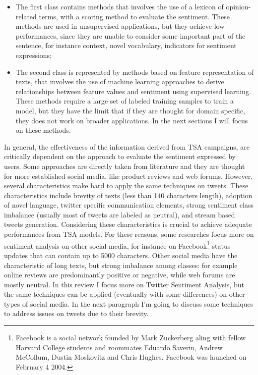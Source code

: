 \begin{itemize}
	\item The first class contains methods that involves the use of a lexicon of opinion-related terms, with a scoring method to evaluate the sentiment. These methods are used in unsupervised applications, but they achieve low performances, since they are unable to consider some important part of the sentence, for instance context, novel vocabulary, indicators for sentiment expressions;
	\item The second class is represented by methods based on feature representation of texts, that involves the use of machine learning approaches to derive relationships between feature values and sentiment using supervised learning. These methods require a large set of labeled training samples to train a model, but they have the limit that if they are thought for domain specific, they does not work on broader applications. In the next sections I will focus on these methods.
\end{itemize}
In general, the effectiveness of the information derived from TSA campaigns, are critically dependent on the approach to evaluate the sentiment expressed by users. Some approaches are directly taken from literature and they are thought for more established social media, like product reviews and web forums. However, several characteristics make hard to apply the same techniques on tweets. These characteristics include brevity of texts (less than 140 characters length), adoption of novel language, twitter specific communication elements, strong sentiment class imbalance (usually most of tweets are labeled as neutral), and stream based tweets generation. Considering these characteristics is crucial to achieve adequate performances from TSA models. For these reasons, some researches focus more on sentiment analysis on other social media, for instance on Facebook\footnote{Facebook is a social network founded by Mark Zuckerberg aling with fellow Harvard College students and roommates Eduardo Saverin, Andrew McCollum, Dustin Moskovitz and Chris Hughes. Facebook was launched on February 4 2004.} status updates that can contain up to 5000 characters. Other social media have the characteristic of long texts, but strong imbalance among classes: for example online reviews are predominantly positive or negative, while web forums are mostly neutral. In this review I focus more on Twitter Sentiment Analysis, but the same techniques can be applied (eventually with some differences) on other types of social media. In the next paragraph I'm going to discuss some techniques to address issues on tweets due to their brevity.

